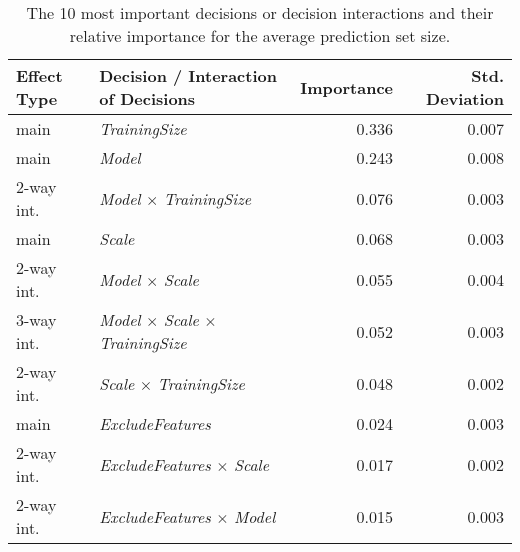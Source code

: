 \begin{table}
\centering
\caption{The 10 most important decisions or decision interactions and their relative importance for the average prediction set size.}
\label{tab:fanova_top10}
\begin{tabular}{llrr}
\toprule
Effect Type &                                   Decision / Interaction of Decisions &  Importance &  Std. Deviation \\
\midrule
       main &                                                 \textit{TrainingSize} &       0.336 &           0.007 \\
       main &                                                        \textit{Model} &       0.243 &           0.008 \\
 2-way int. &                         \textit{Model} $\times$ \textit{TrainingSize} &       0.076 &           0.003 \\
       main &                                                        \textit{Scale} &       0.068 &           0.003 \\
 2-way int. &                                \textit{Model} $\times$ \textit{Scale} &       0.055 &           0.004 \\
 3-way int. & \textit{Model} $\times$ \textit{Scale} $\times$ \textit{TrainingSize} &       0.052 &           0.003 \\
 2-way int. &                         \textit{Scale} $\times$ \textit{TrainingSize} &       0.048 &           0.002 \\
       main &                                              \textit{ExcludeFeatures} &       0.024 &           0.003 \\
 2-way int. &                      \textit{ExcludeFeatures} $\times$ \textit{Scale} &       0.017 &           0.002 \\
 2-way int. &                      \textit{ExcludeFeatures} $\times$ \textit{Model} &       0.015 &           0.003 \\
\bottomrule
\end{tabular}
\end{table}
